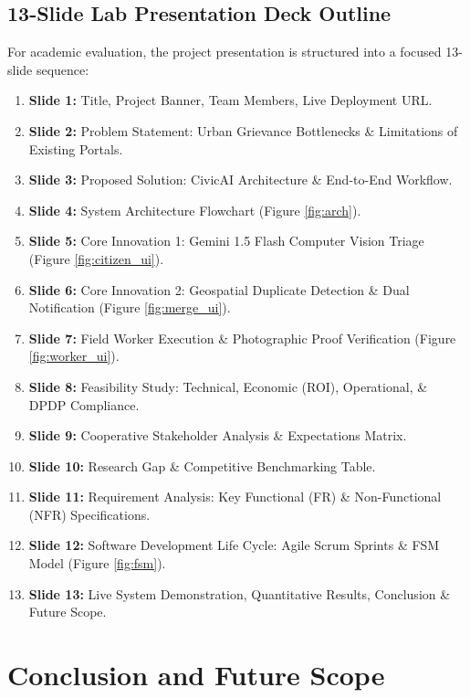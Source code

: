 \documentclass[11pt,a4paper]{article}
\begin{document}
\subsection{13-Slide Lab Presentation Deck Outline}
For academic evaluation, the project presentation is structured into a focused 13-slide sequence:
\begin{enumerate}[leftmargin=1.5em]
    \item \textbf{Slide 1:} Title, Project Banner, Team Members, Live Deployment URL.
    \item \textbf{Slide 2:} Problem Statement: Urban Grievance Bottlenecks \& Limitations of Existing Portals.
    \item \textbf{Slide 3:} Proposed Solution: CivicAI Architecture \& End-to-End Workflow.
    \item \textbf{Slide 4:} System Architecture Flowchart (Figure \ref{fig:arch}).
    \item \textbf{Slide 5:} Core Innovation 1: Gemini 1.5 Flash Computer Vision Triage (Figure \ref{fig:citizen_ui}).
    \item \textbf{Slide 6:} Core Innovation 2: Geospatial Duplicate Detection \& Dual Notification (Figure \ref{fig:merge_ui}).
    \item \textbf{Slide 7:} Field Worker Execution \& Photographic Proof Verification (Figure \ref{fig:worker_ui}).
    \item \textbf{Slide 8:} Feasibility Study: Technical, Economic (ROI), Operational, \& DPDP Compliance.
    \item \textbf{Slide 9:} Cooperative Stakeholder Analysis \& Expectations Matrix.
    \item \textbf{Slide 10:} Research Gap \& Competitive Benchmarking Table.
    \item \textbf{Slide 11:} Requirement Analysis: Key Functional (FR) \& Non-Functional (NFR) Specifications.
    \item \textbf{Slide 12:} Software Development Life Cycle: Agile Scrum Sprints \& FSM Model (Figure \ref{fig:fsm}).
    \item \textbf{Slide 13:} Live System Demonstration, Quantitative Results, Conclusion \& Future Scope.
\end{enumerate}

\section{Conclusion and Future Scope}
\end{document}
